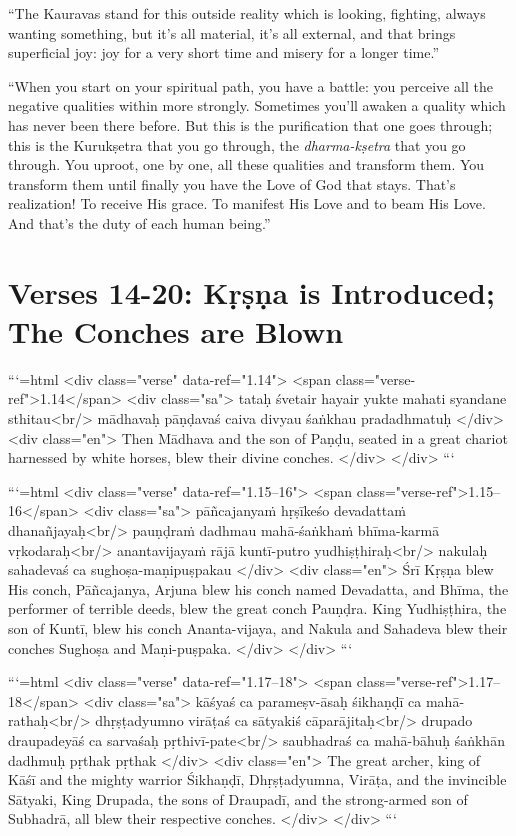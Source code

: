 \enquote{The Kauravas stand for this outside reality which is looking, fighting, always wanting something, but it’s all material, it’s all external, and that brings superficial joy: joy for a very short time and misery for a longer time.}

\enquote{When you start on your spiritual path, you have a battle: you perceive all the negative qualities within more strongly. Sometimes you’ll awaken a quality which has never been there before. But this is the purification that one goes through; this is the Kurukṣetra that you go through, the \textit{dharma-kṣetra} that you go through. You uproot, one by one, all these qualities and transform them. You transform them until finally you have the Love of God that stays. That’s realization! To receive His grace. To manifest His Love and to beam His Love. And that's the duty of each human being.}

\section{Verses 14-20: Kṛṣṇa is Introduced; The Conches are Blown}\label{sec-verses-14-20-krsna-is-introduced-the-conches-are-blown}


```{=html}
<div class="verse" data-ref="1.14">
  <span class="verse-ref">1.14</span>
  <div class="sa">
    tataḥ śvetair hayair yukte mahati syandane sthitau<br/>
    mādhavaḥ pāṇḍavaś caiva divyau śaṅkhau pradadhmatuḥ
  </div>
  <div class="en">
    Then Mādhava and the son of Paṇḍu, seated in a great chariot harnessed by white horses, blew their divine conches.
  </div>
</div>
```



```{=html}
<div class="verse" data-ref="1.15–16">
  <span class="verse-ref">1.15–16</span>
  <div class="sa">
    pāñcajanyaṁ hṛṣīkeśo devadattaṁ dhanañjayaḥ<br/>
    pauṇḍraṁ dadhmau mahā-śaṅkhaṁ bhīma-karmā vṛkodaraḥ<br/>
    anantavijayaṁ rājā kuntī-putro yudhiṣṭhiraḥ<br/>
    nakulaḥ sahadevaś ca sughoṣa-maṇipuṣpakau
  </div>
  <div class="en">
    Śrī Kṛṣṇa blew His conch, Pāñcajanya, Arjuna blew his conch named Devadatta, and Bhīma, the performer of terrible deeds, blew the great conch Pauṇḍra. King Yudhiṣṭhira, the son of Kuntī, blew his conch Ananta-vijaya, and Nakula and Sahadeva blew their conches Sughoṣa and Maṇi-puṣpaka.
  </div>
</div>
```



```{=html}
<div class="verse" data-ref="1.17–18">
  <span class="verse-ref">1.17–18</span>
  <div class="sa">
    kāśyaś ca parameṣv-āsaḥ śikhaṇḍī ca mahā-rathaḥ<br/>
    dhṛṣṭadyumno virāṭaś ca sātyakiś cāparājitaḥ<br/>
    drupado draupadeyāś ca sarvaśaḥ pṛthivī-pate<br/>
    saubhadraś ca mahā-bāhuḥ śaṅkhān dadhmuḥ pṛthak pṛthak
  </div>
  <div class="en">
    The great archer, king of Kāśī and the mighty warrior Śikhaṇḍī, Dhṛṣṭadyumna, Virāṭa, and the invincible Sātyaki, King Drupada, the sons of Draupadī, and the strong-armed son of Subhadrā, all blew their respective conches.
  </div>
</div>
```



